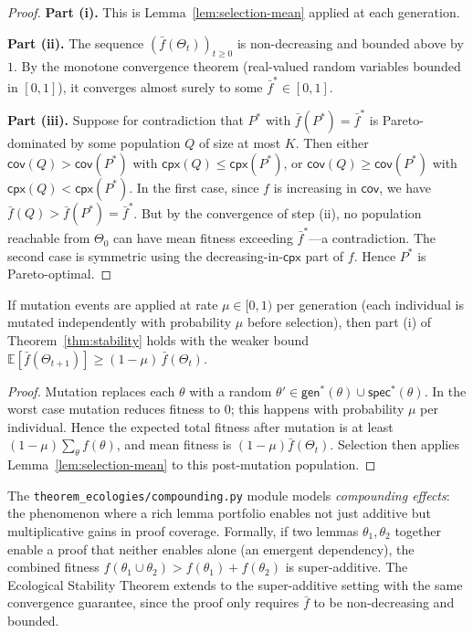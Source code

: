 \documentclass[11pt]{article}
\providecommand{\fit}{f}                    %
\providecommand{\fitbar}{\bar{f}}           %
\providecommand{\Cap}{K}                    %
\providecommand{\gen}{\mathsf{gen}}         %
\providecommand{\spec}{\mathsf{spec}}       %
\providecommand{\cov}{\mathsf{cov}}         %
\providecommand{\cpx}{\mathsf{cpx}}         %
\begin{document}
\begin{proof}
\textbf{Part (i).}  This is Lemma~\ref{lem:selection-mean} applied at
each generation.

\textbf{Part (ii).}  The sequence $(\fitbar(\Theta_t))_{t\geq 0}$ is
non-decreasing and bounded above by $1$.  By the monotone convergence
theorem (real-valued random variables bounded in $[0,1]$), it
converges almost surely to some $\fitbar^* \in [0,1]$.

\textbf{Part (iii).}  Suppose for contradiction that $P^*$ with
$\fitbar(P^*) = \fitbar^*$ is Pareto-dominated by some population
$Q$ of size at most $\Cap$.  Then either $\cov(Q) > \cov(P^*)$ with
$\cpx(Q) \leq \cpx(P^*)$, or $\cov(Q) \geq \cov(P^*)$ with
$\cpx(Q) < \cpx(P^*)$.  In the first case, since $\fit$ is
increasing in $\cov$, we have $\fitbar(Q) > \fitbar(P^*) =
\fitbar^*$.  But by the convergence of step (ii), no population
reachable from $\Theta_0$ can have mean fitness exceeding
$\fitbar^*$---a contradiction.  The second case is symmetric using
the decreasing-in-$\cpx$ part of $\fit$.  Hence $P^*$ is
Pareto-optimal.
\end{proof}

\begin{corollary}\label{cor:stability-mutation}
If mutation events are applied at rate $\mu \in [0,1)$ per generation
(\ie each individual is mutated independently with probability $\mu$
before selection), then part (i) of Theorem~\ref{thm:stability}
holds with the weaker bound
$\mathbb{E}[\fitbar(\Theta_{t+1})] \geq (1 - \mu)\,\fitbar(\Theta_t)$.
\end{corollary}
\begin{proof}
Mutation replaces each $\theta$ with a random
$\theta' \in \gen^*(\theta) \cup \spec^*(\theta)$.  In the worst case
mutation reduces fitness to $0$; this happens with probability $\mu$
per individual.  Hence the expected total fitness after mutation is at
least $(1-\mu)\sum_\theta \fit(\theta)$, and mean fitness is
$(1-\mu)\fitbar(\Theta_t)$.  Selection then applies
Lemma~\ref{lem:selection-mean} to this post-mutation population.
\end{proof}

\begin{remark}\label{rem:compounding}
The \texttt{theorem\_ecologies/compounding.py} module models
\emph{compounding effects}: the phenomenon where a rich lemma portfolio
enables not just additive but multiplicative gains in proof coverage.
Formally, if two lemmas $\theta_1, \theta_2$ together enable a proof
that neither enables alone (an emergent dependency), the combined
fitness $\fit(\theta_1 \cup \theta_2) > \fit(\theta_1) + \fit(\theta_2)$
is super-additive.  The Ecological Stability Theorem extends to the
super-additive setting with the same convergence guarantee, since the
proof only requires $\fitbar$ to be non-decreasing and bounded.
\end{remark}
\end{document}
